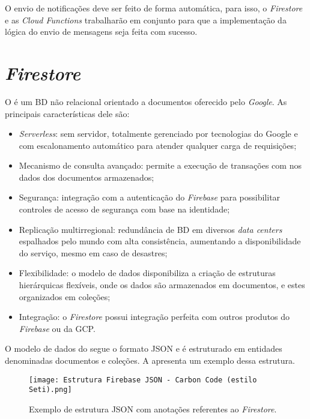 O envio de notificações deve ser feito de forma automática, para isso, o \textit{Firestore} e as \textit{Cloud Functions} trabalharão em conjunto para que a implementação da lógica do envio de mensagens seja feita com sucesso.

\section{\textit{Firestore}}\label{sec:firestore}

O \textcite{FirestoreDocs} é um BD não relacional orientado a documentos oferecido pelo \textit{Google}. As principais características dele são:

\begin{itemize}
    \item \textit{Serverless}: sem servidor, totalmente gerenciado por tecnologias do Google e com escalonamento automático para atender qualquer carga de requisições;
    \item Mecanismo de consulta avançado: permite a execução de transações com  nos dados dos documentos armazenados;
    \item Segurança: integração com a autenticação do \textit{Firebase} para possibilitar controles de acesso de segurança com base na identidade;
    \item Replicação multirregional: redundância de BD em diversos \textit{data centers} espalhados pelo mundo com alta consistência, aumentando a disponibilidade do serviço, mesmo em caso de desastres;
    \item Flexibilidade: o modelo de dados disponibiliza a criação de estruturas hierárquicas flexíveis, onde os dados são armazenados em documentos, e estes organizados em coleções;
    \item Integração: o \textit{Firestore} possui integração perfeita com outros produtos do \textit{Firebase} ou da GCP.
\end{itemize}

O modelo de dados do \textcite{FirestoreDataModel} segue o formato JSON e é estruturado em entidades denominadas documentos e coleções. A  apresenta um exemplo dessa estrutura.

\begin{figure}[!htb]
    \centering
    \texttt{[image: Estrutura Firebase JSON - Carbon Code (estilo Seti).png]}
    \caption{Exemplo de estrutura JSON com anotações referentes ao \textit{Firestore}.}
    \label{fig:exemplofirestorejson}
\end{figure}

